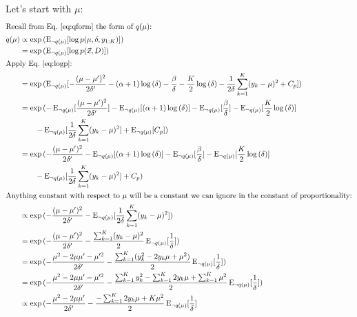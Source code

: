 \documentclass[12pt]{article}
\newcommand{\E}{\operatorname{E}}
\begin{document}
Let's start with $\mu$:
\begin{align}
    \intertext{Recall from Eq.~\ref{eq:qform} the form of $q(\mu)$:}
    q(\mu) &\propto \exp{(\E_{\neg q(\mu)}[\log{p(\mu, \delta, y_{1:K})}])}
    \nonumber \\
    &= \exp{(\E_{\neg q(\mu)}[\log{p(\vec{x}, D)}])}
    \nonumber \\
    \intertext{Apply Eq.~\ref{eq:logp}:}
    &= \exp{(\E_{\neg q(\mu)}[-\frac{(\mu-\mu')^2}{2\delta'}
    - (\alpha+1)\log{(\delta)} - \frac{\beta}{\delta}
    - \frac{K}{2}\log{(\delta)}
    - \frac{1}{2\delta} \sum_{k=1}^{K} (y_{k} - \mu)^2
    + C_p])}
    \nonumber \\
    &= \exp{}(-\E_{\neg q(\mu)}[\frac{(\mu-\mu')^2}{2\delta'}]
    - \E_{\neg q(\mu)}[(\alpha+1)\log{(\delta)}] - \E_{\neg
    q(\mu)}[\frac{\beta}{\delta}]
    - \E_{\neg q(\mu)}[\frac{K}{2}\log{(\delta)}]
    \nonumber \\
    &\qquad
    - \E_{\neg q(\mu)}[\frac{1}{2\delta} \sum_{k=1}^{K} (y_{k} - \mu)^2]
    + \E_{\neg q(\mu)}[C_p])
    \nonumber \\
    &= \exp{}(-\frac{(\mu-\mu')^2}{2\delta'}
    - \E_{\neg q(\mu)}[(\alpha+1)\log{(\delta)}] - \E_{\neg
    q(\mu)}[\frac{\beta}{\delta}]
    - \E_{\neg q(\mu)}[\frac{K}{2}\log{(\delta)}]
    \nonumber \\
    &\qquad
    - \E_{\neg q(\mu)}[\frac{1}{2\delta} \sum_{k=1}^{K} (y_{k} - \mu)^2]
    + C_p)
    \nonumber \\
    \intertext{Anything constant with respect to $\mu$ will be a constant we can
    ignore in the constant of proportionality:}
    &\propto \exp{(-\frac{(\mu-\mu')^2}{2\delta'}
    - \E_{\neg q(\mu)}[\frac{1}{2\delta} \sum_{k=1}^{K} (y_{k} - \mu)^2])}
    \nonumber \\
    &= \exp{(-\frac{(\mu-\mu')^2}{2\delta'}
        - \frac{\sum_{k=1}^{K}(y_{k}-\mu)^2}{2}\E_{\neg q(\mu)}[\frac{1}{\delta}]
    )}
    \nonumber \\
    &= \exp{(-\frac{\mu^2 - 2\mu\mu' -\mu'^2}{2\delta'}
        - \frac{\sum_{k=1}^{K}(y_{k}^2 -2y_{k}\mu + \mu^2)}{2}\E_{\neg q(\mu)}[\frac{1}{\delta}]
    )}
    \nonumber \\
    &= \exp{(-\frac{\mu^2 - 2\mu\mu' -\mu'^2}{2\delta'}
        - \frac{\sum_{k=1}^{K}y_{k}^2 -\sum_{k=1}^{K}2y_{k}\mu + \sum_{k=1}^{K}\mu^2}{2}\E_{\neg q(\mu)}[\frac{1}{\delta}]
    )}
    \nonumber \\
    &\propto \exp{(-\frac{\mu^2 - 2\mu\mu'}{2\delta'}
        - \frac{-\sum_{k=1}^{K}2y_{k}\mu + K\mu^2}{2}\E_{\neg q(\mu)}[\frac{1}{\delta}]
}
\end{align}
\end{document}
